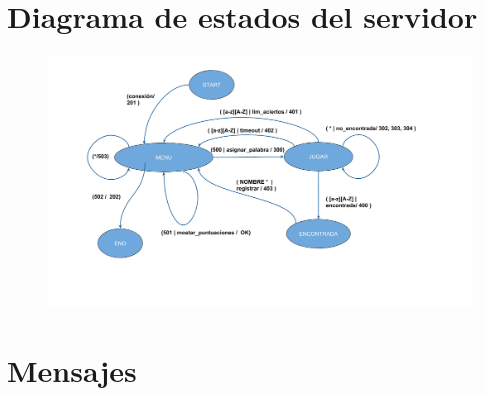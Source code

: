 \documentclass[11pt,a4paper]{article}
\begin{document}
	\section{Diagrama de estados del servidor}
	
	\begin{figure}[H]
	\centering
	\includegraphics[width=1.2\textwidth]{./EsquemaFR.png}
	\end{figure}	
	
	\section{Mensajes}
\end{document}
